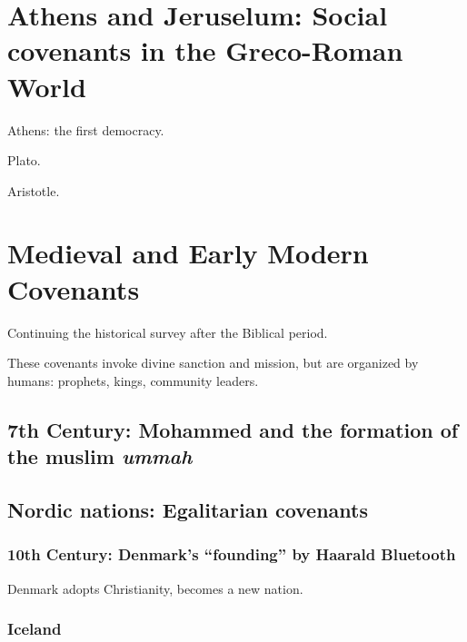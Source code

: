 \documentclass[
]{book}
\begin{document}
\hypertarget{athens-and-jeruselum-social-covenants-in-the-greco-roman-world}{%
\chapter{Athens and Jeruselum: Social covenants in the Greco-Roman World}\label{athens-and-jeruselum-social-covenants-in-the-greco-roman-world}}

Athens: the first democracy.

Plato.

Aristotle.

\hypertarget{medieval-and-early-modern-covenants}{%
\chapter{Medieval and Early Modern Covenants}\label{medieval-and-early-modern-covenants}}

Continuing the historical survey after the Biblical period.

These covenants invoke divine sanction and mission, but are organized by humans: prophets, kings, community leaders.

\hypertarget{th-century-mohammed-and-the-formation-of-the-muslim-ummah}{%
\section{\texorpdfstring{7th Century: Mohammed and the formation of the muslim \emph{ummah}}{7th Century: Mohammed and the formation of the muslim ummah}}\label{th-century-mohammed-and-the-formation-of-the-muslim-ummah}}

\hypertarget{nordic-nations-egalitarian-covenants}{%
\section{Nordic nations: Egalitarian covenants}\label{nordic-nations-egalitarian-covenants}}

\hypertarget{th-century-denmarks-founding-by-haarald-bluetooth}{%
\subsection{10th Century: Denmark's ``founding'' by Haarald Bluetooth}\label{th-century-denmarks-founding-by-haarald-bluetooth}}

Denmark adopts Christianity, becomes a new nation.

\hypertarget{iceland}{%
\subsection{Iceland}\label{iceland}}
\end{document}
